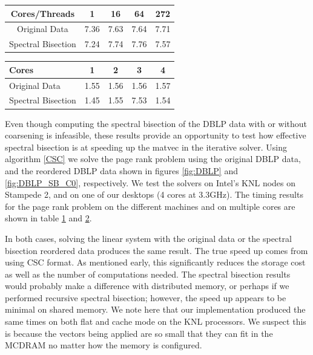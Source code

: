 \documentclass[11pt]{article}
\begin{document}
\begin{table}[h!]
	\centering
	\begin{tabular}[h]{|c||c|c|c|c|}
		\hline
		Cores/Threads& 1 & 16 & 64 & 272 \\
		\hline
		Original Data & 7.36 & 7.63 & 7.64 & 7.71\\
		Spectral Bisection & 7.24 & 7.74 & 7.76 & 7.57 \\
		\hline
	\end{tabular}
\label{tab:KNLTIME}
\end{table}

\begin{table}[h!]
	\centering
	\begin{tabular}[h]{|l||c|c|c|c|}
		\hline
		Cores & 1 & 2& 3 & 4 \\
		\hline
		Original Data & 1.55 & 1.56 & 1.56 & 1.57\\
		Spectral Bisection & 1.45 & 1.55 & 7.53 & 1.54 \\
		\hline
	\end{tabular}
\label{tab:ICESTIME}
\end{table}

Even though computing the spectral bisection of the DBLP data with or without
coarsening is infeasible, these results provide an opportunity to test how
effective spectral bisection is at speeding up the matvec in the iterative
solver. Using algorithm
\ref{CSC} we solve the page rank problem using the original DBLP data, and the
reordered DBLP data shown in figures \ref{fig:DBLP} and \ref{fig:DBLP_SB_C0},
respectively. We test the solvers on Intel's KNL nodes on Stampede 2, and on one
of our desktops (4 cores at 3.3GHz). The timing results for the page rank
problem on the different
machines and on multiple cores are shown in table \ref{tab:KNLTIME} and
\ref{tab:ICESTIME}.

In both cases, solving the linear system with the original data
or the spectral bisection reordered data produces the same result. The true
speed up comes from using CSC format. As mentioned early, this significantly
reduces the storage cost as well as the number of computations needed. The
spectral bisection results would probably make a difference with distributed
memory, or perhaps if we performed recursive spectral bisection; however, the
speed up appears to be minimal on shared memory. We note here that our
implementation produced the same times on both flat and cache mode on the KNL
processors. We suspect this is because the vectors being applied are so small
that they can fit in the MCDRAM no matter how the memory is configured.
\end{document}
